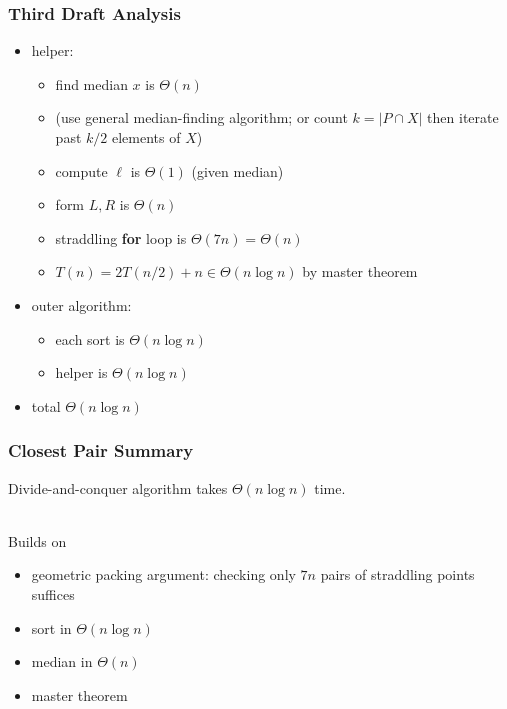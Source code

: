 \documentclass{beamer}
\newcommand{\stanza}{ \\~\ }
\begin{document}
\begin{frame} \frametitle{Third Draft Analysis}
\begin{itemize}
  \item helper:
    \begin{itemize}
      \item find median $x$ is $\Theta(n)$
      \item (use general median-finding algorithm; or count $k=|P \cap X|$
        then iterate past $k/2$ elements of $X$)
      \item compute $\ell$ is $\Theta(1)$ (given median)
      \item form $L, R$ is $\Theta(n)$
      \item straddling \textbf{for} loop is $\Theta(7n) = \Theta(n)$
      \item $T(n) = 2 T(n/2) + n \in \Theta(n \log n)$ by master theorem
    \end{itemize}
  \item outer algorithm:
    \begin{itemize}
      \item each sort is $\Theta(n \log n)$
      \item helper is $\Theta(n \log n)$
    \end{itemize}
  \item total $\Theta(n \log n)$
\end{itemize}
\end{frame}

\begin{frame} \frametitle{Closest Pair Summary}
Divide-and-conquer algorithm takes $\Theta(n \log n)$ time. \stanza

Builds on
\begin{itemize}
  \item geometric packing argument: checking only $7n$ pairs of straddling points suffices
  \item sort in $\Theta(n \log n)$
  \item median in $\Theta(n)$
  \item master theorem
\end{itemize}
\end{frame}
\end{document}
